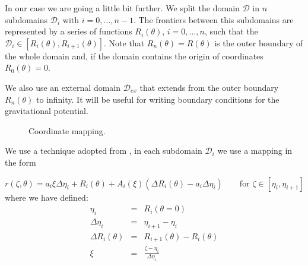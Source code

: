 In our case we are going a little bit further. We split
the domain $\mathcal{D}$ in $n$ subdomains $\mathcal{D}_i$ with
$i=0,\ldots,n-1$. The frontiers between this subdomains are represented
by a series of functions $R_i(\theta)$, $i=0,\ldots,n$, such that
the $\mathcal{D}_i\in[R_{i}(\theta),R_{i+1}(\theta)]$.  Note that
$R_n(\theta)=R(\theta)$ is the outer boundary of the whole domain and,
if the domain contains the origin of coordinates $R_0(\theta)=0$.

We also use an external domain $\mathcal{D}_{ex}$ that extends from the
outer boundary $R_n(\theta)$ to infinity. It will be useful for writing
boundary conditions for the gravitational potential.

\begin{figure}[t]
\centering
{}
\caption{Coordinate mapping.}
\end{figure}


We use a technique adopted from \cite{BGM98}, in each subdomain
$\mathcal{D}_i$ we use a mapping in the form

\begin{equation}
\label{eq:map}
r(\zeta,\theta)=a_i\xi\Delta\eta_i+R_i(\theta)+A_i(\xi)(\Delta R_i(\theta)-a_i\Delta\eta_i) 
\qquad \mbox{for $\zeta\in[\eta_i,\eta_{i+1}]$}
\end{equation}
where we have defined:
\begin{eqnarray*}
\eta_i&=&R_i(\theta=0)\\
\Delta\eta_i&=&\eta_{i+1}-\eta_i\\
\Delta R_i(\theta)&=&R_{i+1}(\theta)-R_{i}(\theta)\\
\xi&=&\displaystyle\frac{\zeta-\eta_i}{\Delta\eta_i}
\end{eqnarray*} 

